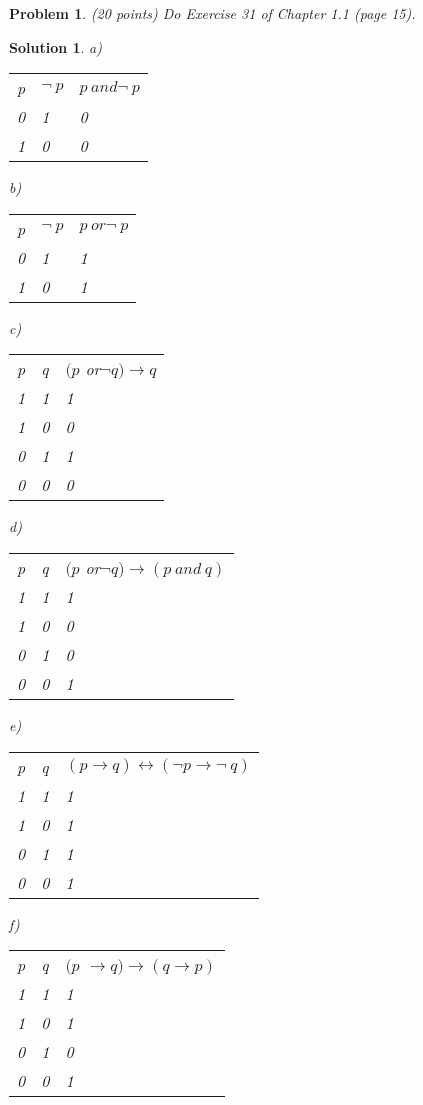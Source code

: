 \documentclass{article}
\newtheorem{problem}[theorem]{Problem}
\newtheorem{solution}[theorem]{Solution}
\begin{document}
\begin{problem}
(20 points)\newline
Do Exercise 31 of Chapter 1.1 (page 15).
\end{problem}

\begin{solution}
a)\qquad 
\begin{tabular}{lll}
p & $\lnot \ p$ & $p\ and\lnot \ p$ \\ 
0 & 1 & 0 \\ 
1 & 0 & 0%
\end{tabular}

b)\qquad 
\begin{tabular}{lll}
p & $\lnot \ p$ & $p\ or\lnot \ p$ \\ 
0 & 1 & 1 \\ 
1 & 0 & 1%
\end{tabular}

c)%
\begin{tabular}{lll}
p & q & $(p$ or$\lnot q)\rightarrow q$ \\ 
1 & 1 & 1 \\ 
1 & 0 & 0 \\ 
0 & 1 & 1 \\ 
0 & 0 & 0%
\end{tabular}

d)%
\begin{tabular}{lll}
p & q & $(p$ or$\lnot q)\rightarrow (p\ and\ q)$ \\ 
1 & 1 & 1 \\ 
1 & 0 & 0 \\ 
0 & 1 & 0 \\ 
0 & 0 & 1%
\end{tabular}

e)%
\begin{tabular}{lll}
p & q & $(p\rightarrow q)\leftrightarrow (\lnot p\rightarrow \lnot \ q)$ \\ 
1 & 1 & 1 \\ 
1 & 0 & 1 \\ 
0 & 1 & 1 \\ 
0 & 0 & 1%
\end{tabular}

f)%
\begin{tabular}{lll}
p & q & $(p$ $\rightarrow q)\rightarrow (q\rightarrow p)$ \\ 
1 & 1 & 1 \\ 
1 & 0 & 1 \\ 
0 & 1 & 0 \\ 
0 & 0 & 1%
\end{tabular}
\end{solution}
\end{document}
